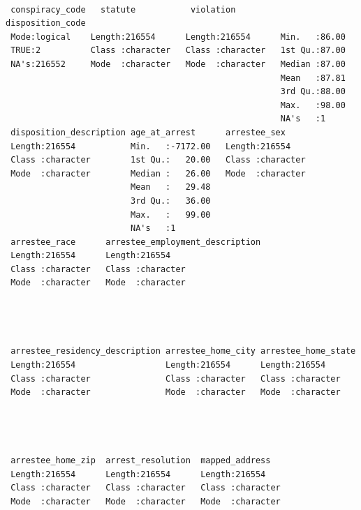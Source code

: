 \documentclass[
  article]{jss}
\begin{document}
\begin{verbatim}
                                                                      
 conspiracy_code   statute           violation         disposition_code
 Mode:logical    Length:216554      Length:216554      Min.   :86.00   
 TRUE:2          Class :character   Class :character   1st Qu.:87.00   
 NA's:216552     Mode  :character   Mode  :character   Median :87.00   
                                                       Mean   :87.81   
                                                       3rd Qu.:88.00   
                                                       Max.   :98.00   
                                                       NA's   :1       
 disposition_description age_at_arrest      arrestee_sex      
 Length:216554           Min.   :-7172.00   Length:216554     
 Class :character        1st Qu.:   20.00   Class :character  
 Mode  :character        Median :   26.00   Mode  :character  
                         Mean   :   29.48                     
                         3rd Qu.:   36.00                     
                         Max.   :   99.00                     
                         NA's   :1                            
 arrestee_race      arrestee_employment_description
 Length:216554      Length:216554                  
 Class :character   Class :character               
 Mode  :character   Mode  :character               
                                                   
                                                   
                                                   
                                                   
 arrestee_residency_description arrestee_home_city arrestee_home_state
 Length:216554                  Length:216554      Length:216554      
 Class :character               Class :character   Class :character   
 Mode  :character               Mode  :character   Mode  :character   
                                                                      
                                                                      
                                                                      
                                                                      
 arrestee_home_zip  arrest_resolution  mapped_address    
 Length:216554      Length:216554      Length:216554     
 Class :character   Class :character   Class :character  
 Mode  :character   Mode  :character   Mode  :character  
                                                         
                                                         
                                                         
                                                         
\end{verbatim}
\end{document}
